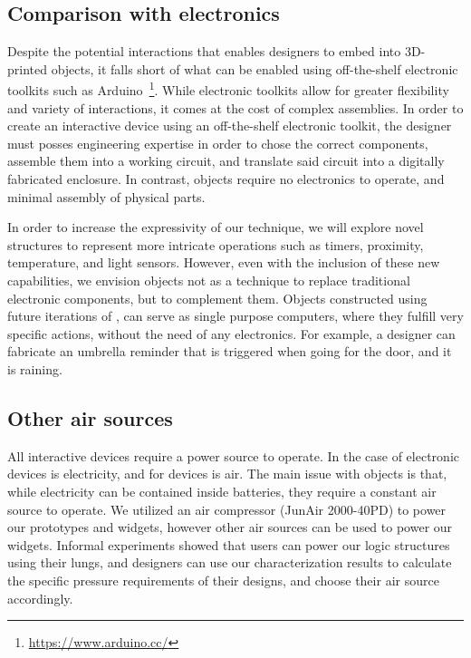       \subsection{Comparison with electronics}
        Despite the potential interactions that \al enables designers to
        embed into 3D-printed objects, it falls short of what can be
        enabled using off-the-shelf electronic toolkits such as
        Arduino~\footnote{\url{https://www.arduino.cc/}}. While electronic
        toolkits allow for greater flexibility and variety of interactions,
        it comes at the cost of complex assemblies. In order to create an
        interactive device using an off-the-shelf electronic toolkit, the
        designer must posses engineering expertise in order to chose the
        correct components, assemble them into a working circuit, and
        translate said circuit into a digitally fabricated enclosure. In
        contrast, \al objects require no electronics to operate, and
        minimal assembly of physical parts.
        
        In order to increase the expressivity of our technique, we will
        explore novel structures to represent more intricate operations
        such as timers, proximity, temperature, and light sensors. However,
        even with the inclusion of these new capabilities, we envision \al
        objects not as a technique to replace traditional electronic
        components, but to complement them. Objects constructed using
        future iterations of \al, can serve as single purpose computers,
        where they fulfill very specific actions, without the need of any
        electronics. For example, a designer can fabricate an umbrella
        reminder that is triggered when going for the door, and it is
        raining.

      \subsection{Other air sources}
        All interactive devices require a power source to operate. In the
        case of electronic devices is electricity, and for \al devices is
        air. The main issue with \al objects is that, while electricity can
        be contained inside batteries, they require a constant air source
        to operate. We utilized an air compressor (JunAir 2000-40PD) to
        power our prototypes and widgets, however other air sources can be
        used to power our widgets. Informal experiments showed that users can
        power our logic structures using their lungs, and designers can use our
        characterization results to calculate the specific pressure requirements
        of their designs, and choose their air source accordingly.
        
